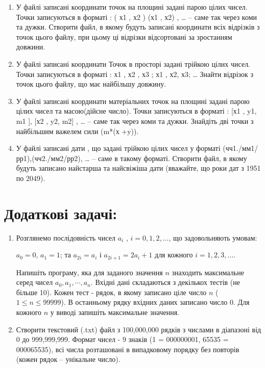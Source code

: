 \documentclass[a5paper,titlepage,openany,twoside,
]
{book_unv}%
\begin{document}
\begin{enumerate}
\begin{enumerate}
\item 
У файлі записані координати точок на площині задані парою цілих
чисел. Точки записуються в форматі : ( х1 , х2 ) (х1 , х2) , \ldots{} --
саме так через коми та дужки. Створити файл, в якому будуть записані
координати всіх відрізків з точок цього файлу, при цьому ці відрізки
відсортовані за зростанням довжини.

\item 
У файлі записані координати Точок в просторі задані трійкою цілих
чисел. Точки записуються в форматі : х1 , х2 , х3 ; х1 , х2, х3;
\ldots{} Знайти відрізок з точок цього файлу, що має найбільшу довжину.

\item 
У файлі записані координати матеріальних точок на площині задані
парою цілих чисел та масою(дійсне число). Точки записуються в форматі :
{[}х1 , y1, m1 {]}, {[}х2 , y2, m2{]} , \ldots{}  -- саме так
через коми та дужки. Знайдіть дві точки з найбільшим важелем сили (m*(х
+y)).

\item 
У файлі записані дати , що задані трійкою цілих чисел у форматі
(чч1./мм1/рр1),(чч2./мм2/рр2), \ldots{} -- саме в такому форматі.
Створити файл, в якому будуть записано найстарша та найсвіжіша дати
(вважайте, що роки дат з 1951 по 2049).
\end{enumerate}


\section{Додаткові задачі:}
\begin{enumerate}
\def\labelenumi{\arabic{enumi})}
\setcounter{enumi}{21}

\item  Розглянемо послідовність чисел \(a_{i}\) , $i = 0, 1, 2, \ldots$, що
задовольняють умовам:

\(a_{0} = 0\), \(a_{1} = 1\); та \(a_{2i} = a_{i}\) і
\(a_{2i + 1} = {2a}_{i} + 1\) для кожного $i = 1, 2, 3, \ldots{} $.

Напишіть програму, яка для заданого значення $n$ знаходить максимальне
серед чисел \(a_{0},a_{1},\cdots,a_{n}\). Вхідні дані складаються з
декількох тестів (не більше 10). Кожен тест - рядок, в якому записано
ціле число $n$ ($1 \le n \le 99 999$). В останньому рядку вхідних даних записано
число 0. Для кожного $n$ у виводі запишіть максимальне значення.

\item
Створити текстовий (.txt) файл з 100,000,000 рядків з числами
в діапазоні від 0 до 999,999,999. Формат чисел - 9 знаків 
(1 = 000000001, 65535 = 000065535), всі числа розташовані в випадковому порядку без
повторів (кожен рядок -- унікальне число).


\end{enumerate}
\end{enumerate}
\end{document}
